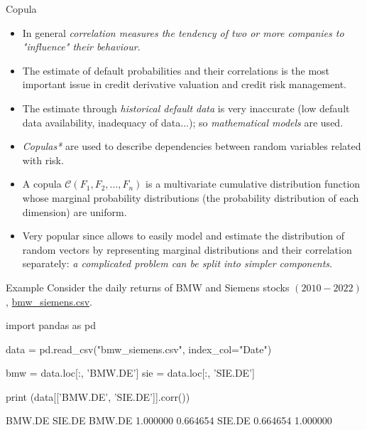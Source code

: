 \documentclass{beamer}
\begin{document}
\begin{frame}{Copula}
  \begin{itemize}
  \item In general \emph{correlation measures the tendency of two or more companies to "influence" their behaviour}. 
  \item The estimate of default probabilities and their correlations is the most important issue in credit derivative valuation and credit risk management. 
  \item The estimate through \emph{historical default data} is very inaccurate (low default data availability, inadequacy of data...); so \emph{mathematical models} are used.
  \item \emph{Copulas*} are used to describe dependencies between random variables related with risk. 
  \item A copula $\mathcal{C}(F_1, F_2, \ldots, F_n)$ is a multivariate cumulative distribution function whose marginal probability distributions (the probability distribution of each dimension) are uniform. 
  \item Very popular since allows to easily model and estimate the distribution of random vectors by representing marginal distributions and their correlation separately: \emph{a complicated problem can be split into simpler components}.
  \end{itemize}
\end{frame}

\begin{frame}[fragile]{Example}
  Consider the daily returns of BMW and Siemens stocks $(2010-2022)$, \href{https:\/\/github.com\/matteosan1\/finance\_course\/raw\/develop\/input\_files\/bmw\_siemens.csv}{bmw\_siemens.csv}.
  \begin{ipython}
import pandas as pd

data = pd.read_csv("bmw_siemens.csv", index_col="Date")

bmw = data.loc[:, 'BMW.DE']
sie = data.loc[:, 'SIE.DE']

print (data[['BMW.DE', 'SIE.DE']].corr())
\end{ipython}
  \begin{ioutput}
          BMW.DE    SIE.DE
BMW.DE  1.000000  0.664654
SIE.DE  0.664654  1.000000    
\end{ioutput}
\end{frame}
\end{document}
